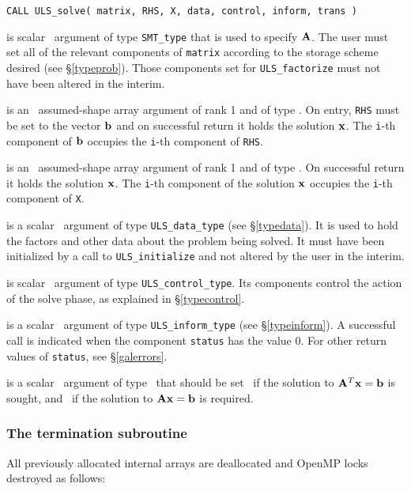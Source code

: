 \documentclass{galahad}
\newcommand{\packagename}{ULS}
\begin{document}
\hskip0.5in
{\tt CALL \packagename\_solve( matrix, RHS, X, data, control, inform, trans )}

\begin{description}

 is scalar \intentin\ argument of type {\tt SMT\_type}
that is used to specify ${\mathbf{A}}$.
The user must set all of the relevant components of {\tt matrix} according
to the storage scheme desired (see \S\ref{typeprob}). Those components
set for {\tt \packagename\_factorize} must not have been altered in the interim.

 is an \intentin\ assumed-shape array argument of rank 1
and of type \realdp.  On entry, {\tt RHS} must be set
to the vector ${\mathbf{b}}$ and on successful return it holds
the solution ${\mathbf{x}}$. The {\tt i}-th component of ${\mathbf{b}}$
occupies the {\tt i}-th component of {\tt RHS}.

 is an \intentinout\ assumed-shape array argument of rank 1
and of type \realdp.  On successful return it holds the solution ${\mathbf{x}}$.
The {\tt i}-th component of the solution ${\mathbf{x}}$
occupies the {\tt i}-th component of {\tt X}.

 is a scalar \intentinout\ argument of type
{\tt \packagename\_data\_type}
(see \S\ref{typedata}). It is used to hold the factors and other
data about the problem being solved.
It must have been initialized by a call to
{\tt \packagename\_ini\-tialize} and not altered by the user in the interim.

 is scalar \intentin\ argument of type
{\tt \packagename\_control\_type}. Its components control the action
of the solve phase, as explained in
\S\ref{typecontrol}.

 is a scalar \intentinout\ argument of type
{\tt \packagename\_inform\_type}
(see \S\ref{typeinform}).
A successful call is indicated when the  component {\tt status} has the value 0.
For other return values of {\tt status}, see \S\ref{galerrors}.

 is a scalar \intentin\ argument of type \logical\ that should be
set \true\ if the solution to ${\mathbf{A}}^T {\mathbf{x}} = {\mathbf{b}}$ is sought,
and \false\ if the solution to ${\mathbf{A}} {\mathbf{x}} = {\mathbf{b}}$ is required.

\end{description}


\subsubsection{The termination subroutine}
All previously allocated internal arrays are deallocated and OpenMP locks
destroyed as follows:
\end{document}
